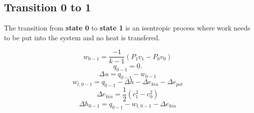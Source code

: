 \documentclass[11pt]{article}
\begin{document}
    

    \subsection{Transition 0 to 1}\label{transition-0-to-1}

The transition from \textbf{state 0} to \textbf{state 1} is an
isentropic process where work needs to be put into the system and no
heat is transfered.

\begin{equation}
    w_{0-1} = \frac{-1}{k-1}\left(P_1 v_1 - P_0 v_0\right)
\end{equation}\begin{equation}
    q_{0-1} = 0.
\end{equation}\begin{equation}
    \Delta u = q_{0-1} - w_{0-1}
\end{equation}\begin{equation}
    w_{t,0-1} = q_{0-1} - \Delta h - \Delta e_{kin} - \Delta e_{pot}
\end{equation}\begin{equation}
    \Delta e_{kin} = \frac{1}{2}(c_1^2 - c_0^2)
\end{equation}\begin{equation}
    \Delta h_{0-1} = q_{0-1} - w_{t,0-1} - \Delta e_{kin}
\end{equation}
\end{document}
